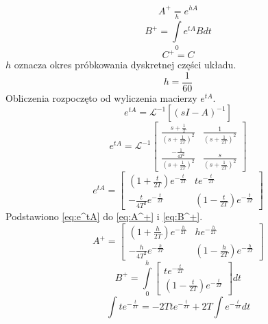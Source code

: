 \begin{equation}
\label{eq:A^+}
A^+=e^{hA}
\end{equation}
\begin{equation}
\label{eq:B^+}
B^+=\int\limits_{0}^{h}e^{tA}Bdt
\end{equation}
\begin{equation}
C^+=C
\end{equation}
\(h\) oznacza okres próbkowania dyskretnej części układu.
\begin{equation}
h=\frac{1}{60}
\end{equation}
Obliczenia rozpoczęto od wyliczenia macierzy \(e^{tA}\).
\begin{equation}
e^{tA}=\mathcal{L}^{-1}[(sI-A)^{-1}]
\end{equation}
\begin{equation}
e^{tA}=\mathcal{L}^{-1}
	\begin{bmatrix}
	\frac{s+\frac{1}{T}}{(s+\frac{1}{2T})^2} & \frac{1}{(s+\frac{1}{2T})^2} \\
	\frac{-\frac{1}{4T^2}}{(s+\frac{1}{2T})^2} &  \frac{s}{(s+\frac{1}{2T})^2}
	\end{bmatrix}
\end{equation}
\begin{equation}
\label{eq:e^tA}
e^{tA}=
	\begin{bmatrix}
	(1+\frac{t}{2T})e^{-\frac{t}{2T}} & te^{-\frac{t}{2T}} \\
	-\frac{t}{4T^2}e^{-\frac{t}{2T}} & (1-\frac{t}{2T})e^{-\frac{t}{2T}}
	\end{bmatrix}
\end{equation}
Podstawiono \ref{eq:e^tA} do \ref{eq:A^+} i \ref{eq:B^+}.
\begin{equation}
A^+=
	\begin{bmatrix}
	(1+\frac{h}{2T})e^{-\frac{h}{2T}} & he^{-\frac{h}{2T}} \\
	-\frac{h}{4T^2}e^{-\frac{h}{2T}} & (1-\frac{h}{2T})e^{-\frac{h}{2T}}
	\end{bmatrix}
\end{equation}
\begin{equation}
B^+=\int\limits_{0}^{h}
	\begin{bmatrix}
	te^{-\frac{t}{2T}} \\
	(1-\frac{t}{2T})e^{-\frac{t}{2T}}
	\end{bmatrix}
	dt
\end{equation}
\begin{equation}
\int te^{-\frac{t}{2T}}=-2Tte^{-\frac{t}{2T}}+2T\int e^{-\frac{t}{2T}}dt
\end{equation}
